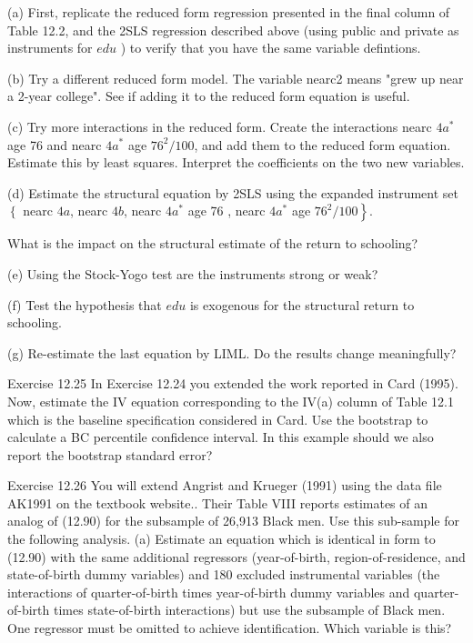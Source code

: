 \documentclass[10pt]{article}
\begin{document}
(a) First, replicate the reduced form regression presented in the final column of Table 12.2, and the 2SLS regression described above (using public and private as instruments for $e d u$ ) to verify that you have the same variable defintions.

(b) Try a different reduced form model. The variable nearc2 means "grew up near a 2-year college". See if adding it to the reduced form equation is useful.

(c) Try more interactions in the reduced form. Create the interactions nearc $4 a^{*}$ age 76 and nearc $4 a^{*}$ age $76^{2} / 100$, and add them to the reduced form equation. Estimate this by least squares. Interpret the coefficients on the two new variables.

(d) Estimate the structural equation by 2SLS using the expanded instrument set $\left\{\right.$ nearc $4 a$, nearc $4 b$, nearc $4 a^{*}$ age 76 , nearc $4 a^{*}$ age $\left.76^{2} / 100\right\}$.

What is the impact on the structural estimate of the return to schooling?

(e) Using the Stock-Yogo test are the instruments strong or weak?

(f) Test the hypothesis that $e d u$ is exogenous for the structural return to schooling.

(g) Re-estimate the last equation by LIML. Do the results change meaningfully?

Exercise 12.25 In Exercise 12.24 you extended the work reported in Card (1995). Now, estimate the IV equation corresponding to the IV(a) column of Table 12.1 which is the baseline specification considered in Card. Use the bootstrap to calculate a BC percentile confidence interval. In this example should we also report the bootstrap standard error?

Exercise 12.26 You will extend Angrist and Krueger (1991) using the data file AK1991 on the textbook website.. Their Table VIII reports estimates of an analog of (12.90) for the subsample of 26,913 Black men. Use this sub-sample for the following analysis. (a) Estimate an equation which is identical in form to (12.90) with the same additional regressors (year-of-birth, region-of-residence, and state-of-birth dummy variables) and 180 excluded instrumental variables (the interactions of quarter-of-birth times year-of-birth dummy variables and quarter-of-birth times state-of-birth interactions) but use the subsample of Black men. One regressor must be omitted to achieve identification. Which variable is this?
\end{document}
